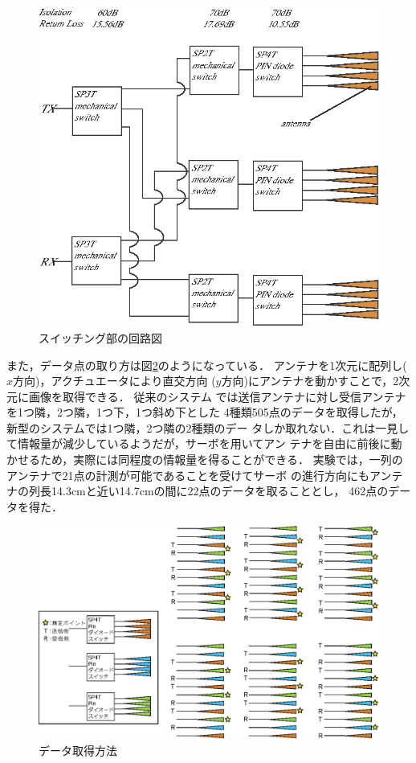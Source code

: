 ﻿\documentclass[12pt,oneside]{jsbook}
\begin{document}
\begin{figure}[btp]
\begin{center}
\includegraphics[width =0.8\hsize ]{switch-circuit.eps}
\caption{スイッチング部の回路図}
\label{scircuit}
 \end{center}
\end{figure}

また，データ点の取り方は図\ref{so2get}のようになっている．
アンテナを1次元に配列し($x$方向)，アクチュエータにより直交方向
($y$方向)にアンテナを動かすことで，2次元に画像を取得できる．
従来のシステム
では送信アンテナに対し受信アンテナを1つ隣，2つ隣，1つ下，1つ斜め下とした
4種類505点のデータを取得したが，新型のシステムでは1つ隣，2つ隣の2種類のデー
タしか取れない．これは一見して情報量が減少しているようだが，サーボを用いてアン
テナを自由に前後に動かせるため，実際には同程度の情報量を得ることができる．
実験では，一列のアンテナで21点の計測が可能であることを受けてサーボ
の進行方向にもアンテナの列長14.3cmと近い14.7cmの間に22点のデータを取ることとし，
462点のデータを得た．
\begin{figure}[btp]
 \begin{center}
 \includegraphics[width =\hsize ]{switch-circuit2.eps}
\caption{データ取得方法}
\label{so2get}
 \end{center}
\end{figure}
\newpage
\end{document}
